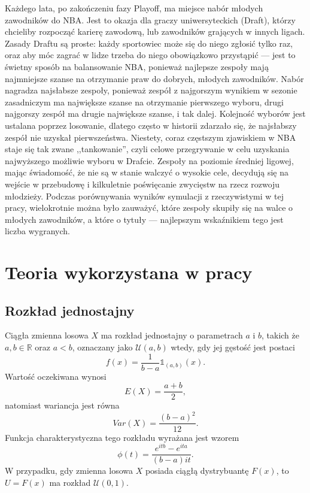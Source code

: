 \documentclass[inzynierska]{pwr_wmat_praca_dyplomowa}
\theoremstyle{plain}
\numberwithin{theorem}{chapter}
\theoremstyle{definition}
\numberwithin{theorem}{chapter}
\begin{document}
Każdego lata, po zakończeniu fazy Playoff, ma miejsce nabór młodych zawodników do NBA. Jest to okazja dla graczy uniwersyteckich (Draft), którzy chcieliby rozpocząć karierę zawodową, lub zawodników grających w innych ligach. Zasady Draftu są proste: każdy sportowiec może się do niego zgłosić tylko raz, oraz aby móc zagrać w lidze trzeba do niego obowiązkowo przystąpić --- jest to świetny sposób na balansowanie NBA, ponieważ najlepsze zespoły mają najmniejsze szanse na otrzymanie praw do dobrych, młodych zawodników. Nabór nagradza najsłabsze zespoły, ponieważ zespół z najgorszym wynikiem w sezonie zasadniczym ma największe szanse na otrzymanie pierwszego wyboru, drugi najgorszy zespół ma drugie największe szanse, i tak dalej. Kolejność wyborów jest ustalana poprzez losowanie, dlatego często w historii zdarzało się, że najsłabszy zespół nie uzyskał pierwszeństwa. Niestety, coraz częstszym zjawiskiem w NBA staje się tak zwane ,,tankowanie'', czyli celowe przegrywanie w celu uzyskania najwyższego możliwie wyboru w Drafcie. Zespoły na poziomie średniej ligowej, mając świadomość, że nie są w stanie walczyć o wysokie cele, decydują się na wejście w przebudowę i kilkuletnie poświęcanie zwycięstw na rzecz rozwoju młodzieży. Podczas porównywania wyników symulacji z rzeczywistymi w tej pracy, wielokrotnie można było zauważyć, które zespoły skupiły się na walce o młodych zawodników, a które o tytuły --- najlepszym wskaźnikiem tego jest liczba wygranych.

\chapter{Teoria wykorzystana w pracy}

\section{Rozkład jednostajny}
Ciągła zmienna losowa $X$ ma rozkład jednostajny o parametrach $a$ i $b$, takich że $a,b\in \mathds{R}$ oraz $a<b$, oznaczany jako $\mathcal{U}(a,b)$ wtedy, gdy jej gęstość jest postaci
\begin{equation}
f(x)=\frac{1}{b-a}\mathds{1}_{(a,b)}(x).
\end{equation}
Wartość oczekiwana wynosi
\begin{equation}
E(X)=\frac{a+b}{2},
\end{equation}
natomiast wariancja jest równa
\begin{equation}
Var(X)=\frac{(b-a)^2}{12}.
\end{equation} 
Funkcja charakterystyczna tego rozkładu wyrażana jest wzorem
\begin{equation}
\phi(t)=\frac{e^{itb}-e^{ita}}{(b-a)it}.
\end{equation}
W przypadku, gdy zmienna losowa $X$ posiada ciągłą dystrybuantę $F(x)$, to $U=F(x)$ ma rozkład $\mathcal{U}(0,1).$ \cite{magiera}
\end{document}
